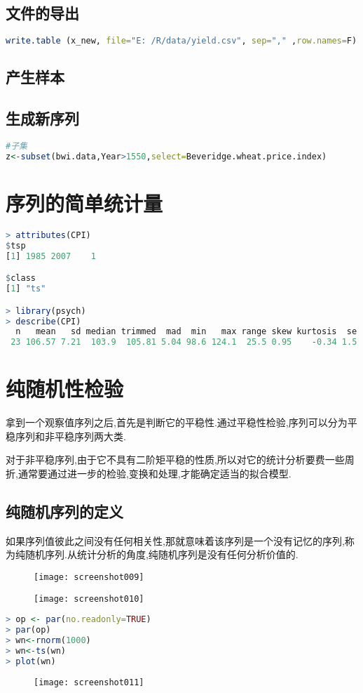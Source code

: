 \documentclass[11pt,a4paper,oneside]{book}
\begin{document}
\section{文件的导出}
\begin{lstlisting}[language=r]
write.table (x_new, file="E: /R/data/yield.csv", sep="," ,row.names=F)
\end{lstlisting}

\section{产生样本}
\section{生成新序列}
\begin{lstlisting}[language=r]
#子集
z<-subset(bwi.data,Year>1550,select=Beveridge.wheat.price.index)
\end{lstlisting}



\chapter{序列的简单统计量}
\begin{lstlisting}[language=r]
> attributes(CPI)
$tsp
[1] 1985 2007    1

$class
[1] "ts"

> library(psych)
> describe(CPI)
  n   mean   sd median trimmed  mad  min   max range skew kurtosis  se
 23 106.57 7.21  103.9  105.81 5.04 98.6 124.1  25.5 0.95    -0.34 1.5
\end{lstlisting}

\chapter{纯随机性检验}\label{cha:01}
拿到一个观察值序列之后,首先是判断它的平稳性.通过平稳性检验,序列可以分为平稳序列和非平稳序列两大类.

对于非平稳序列,由于它不具有二阶矩平稳的性质,所以对它的统计分析要费一些周折,通常要通过进一步的检验,变换和处理,才能确定适当的拟合模型.
\section{纯随机序列的定义}
如果序列值彼此之间没有任何相关性,那就意味着该序列是一个没有记忆的序列,称为纯随机序列.从统计分析的角度,纯随机序列是没有任何分析价值的.
\begin{figure}[H]
	\texttt{[image: screenshot009]}
	\label{fig:screenshot009}
\end{figure}
\begin{figure}[H]
	\texttt{[image: screenshot010]}
	\label{fig:screenshot010}
\end{figure}
\begin{lstlisting}[language=r]
> op <- par(no.readonly=TRUE)
> par(op)
> wn<-rnorm(1000)
> wn<-ts(wn)
> plot(wn)
\end{lstlisting}
\begin{figure}[H]
	\texttt{[image: screenshot011]}
	\label{fig:screenshot011}
\end{figure}
\end{document}
